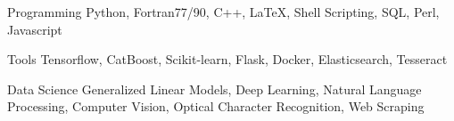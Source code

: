 


\begin{cvskills}








\cvskill
{Programming} %
{Python, Fortran77/90, C++, LaTeX, Shell Scripting, SQL, Perl, Javascript} %


\cvskill
{Tools} %
{Tensorflow, CatBoost, Scikit-learn, Flask, Docker, Elasticsearch, Tesseract} %



\cvskill
{Data Science} %
{Generalized Linear Models, Deep Learning, Natural Language Processing, Computer Vision, Optical Character Recognition, Web Scraping} %






\end{cvskills}
